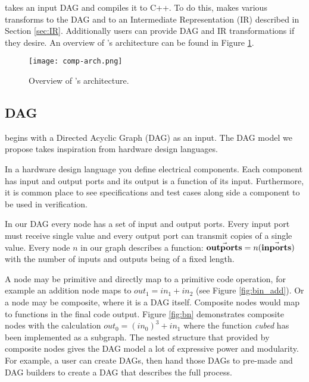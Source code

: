 \phlat takes an input DAG and compiles it to C++.
To do this, \phlat makes various transforms to the DAG and to an Intermediate Representation (IR) described in Section \ref{sec:IR}.
Additionally users can provide DAG and IR transformations if they desire.
An overview of \phlat{}'s architecture can be found in Figure \ref{fig:arch}.

\begin{figure}[h!]
    \begin{center}
        \texttt{[image: comp-arch.png]}
        \caption{Overview of \phlat{}'s architecture.}
        \label{fig:arch}
    \end{center}
\end{figure}



\subsection{DAG} \label{sec:DAG}

\phlat begins with a Directed Acyclic Graph (DAG) as an input.
The DAG model we propose takes inspiration from hardware design languages.

In a hardware design language you define electrical components.
Each component has input and output ports and its output is a function of its input.
Furthermore, it is common place to see specifications and test cases along side a component to be used in verification.

In our DAG every node has a set of input and output ports.
Every input port must receive single value and every output port can transmit copies of a single value.
Every node $n$ in our graph describes a function: $\vec{\mathbf{out ports}}=n(\vec{\mathbf{in ports}})$ with the number of inputs and outputs being of a fixed length.

A node may be primitive and directly map to a primitive code operation, for example an addition node maps to $out_1 = in_1 + in_2$ (see Figure \ref{fig:bin_add}).
Or a node may be composite, where it is a DAG itself.
Composite nodes would map to functions in the final code output.
Figure \ref{fig:bn} demonstrates composite nodes with the calculation $out_0 = (in_0)^3 + in_1$ where the function \textit{cubed} has been implemented as a subgraph.
The nested structure that provided by composite nodes gives the DAG model a lot of expressive power and modularity.
For example, a user can create  DAGs, then hand those DAGs to pre-made  and  DAG builders to create a DAG that describes the full  process.


